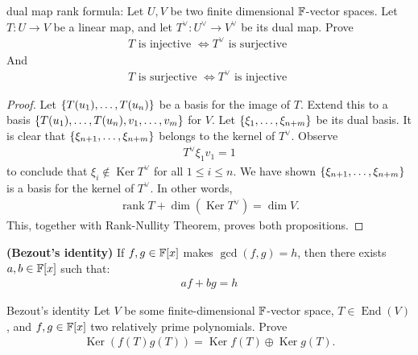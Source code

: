 \documentclass{report}
\begin{document}
\begin{question}{dual map rank formula: }{}
  Let $U,V$ be two finite dimensional $\mathbb{F}$-vector spaces. Let  $T:U\rightarrow V$ be a linear map, and let $T^\vee:U^\vee\rightarrow V^\vee$ be its dual map. Prove 
\begin{align*}
T\text{ is injective }\iff T^\vee\text{ is surjective }   
\end{align*}
And 
\begin{align*}
T\text{ is surjective }\iff T^\vee\text{ is injective }
\end{align*}
\end{question}
\begin{proof}
Let $\left\{ T(u_1),\dots ,T(u_n) \right\}$ be a basis for the image of $T$. Extend this to a basis $\left\{ T(u_1),\dots ,T(u_n),v_1,\dots ,v_m \right\}$ for $V$. Let $\left\{ \xi_1,\dots ,\xi_{n+m} \right\}$ be its dual basis. It is clear that $\left\{ \xi_{n+1},\dots ,\xi_{n+m} \right\}$ belongs to the kernel of $T^\vee$. Observe  
\begin{align*}
T^\vee\xi_1v_1 = 1
\end{align*}
to conclude that $\xi_i \not\in \operatorname{Ker}T^\vee$ for all $1\leq i\leq n$. We have shown $\left\{ \xi_{n+1},\dots ,\xi_{n+m} \right\}$ is a basis for the kernel of $T^\vee$. In other words,  
\begin{align}
\label{EQrTd}
   \operatorname{rank}T+\operatorname{dim}(\operatorname{Ker}T^\vee)= \operatorname{dim}V.
\end{align}
This, together with Rank-Nullity Theorem, proves both propositions.
\end{proof}
\begin{theorem}
\label{THBi}
  \textbf{(Bezout's identity)} If $f,g \in \mathbb{F}[x]$ makes $\operatorname{gcd}(f,g)=h$, then there exists $a,b \in \mathbb{F}[x]$ such that: 
\begin{align*}
af+bg= h
\end{align*}
\end{theorem}
\begin{question}{Bezout's identity}{}
Let $V$ be some finite-dimensional $\mathbb{F}$-vector space,  $T \in \operatorname{End}(V)$, and $f,g\in \mathbb{F}[x]$ two relatively prime polynomials. Prove 
\begin{align*}
\operatorname{Ker}(f(T)g(T))= \operatorname{Ker}f(T)\oplus \operatorname{Ker}g(T).
\end{align*}
\end{question}
\end{document}
